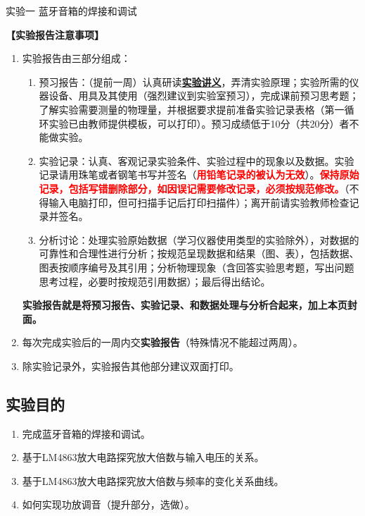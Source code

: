 \documentclass[dvipsnames, svgnames,a4paper,11pt]{article}
\begin{document}
\scoresTable{}{}{}{}{}{}{}{}


\begin{center}
	\LARGE 实验一 \quad 蓝牙音箱的焊接和调试
\end{center}

\textbf{【实验报告注意事项】}
\begin{enumerate}
	\item 实验报告由三部分组成：
	\begin{enumerate}
		\item 预习报告：（提前一周）认真研读\underline{\textbf{实验讲义}}，弄清实验原理；实验所需的仪器设备、用具及其使用（强烈建议到实验室预习），完成课前预习思考题；了解实验需要测量的物理量，并根据要求提前准备实验记录表格（第一循环实验已由教师提供模板，可以打印）。预习成绩低于10分（共20分）者不能做实验。
	    \item 实验记录：认真、客观记录实验条件、实验过程中的现象以及数据。实验记录请用珠笔或者钢笔书写并签名（\textcolor{red}{\textbf{用铅笔记录的被认为无效}}）。\textcolor{red}{\textbf{保持原始记录，包括写错删除部分，如因误记需要修改记录，必须按规范修改。}}（不得输入电脑打印，但可扫描手记后打印扫描件）；离开前请实验教师检查记录并签名。
	    \item 分析讨论：处理实验原始数据（学习仪器使用类型的实验除外），对数据的可靠性和合理性进行分析；按规范呈现数据和结果（图、表），包括数据、图表按顺序编号及其引用；分析物理现象（含回答实验思考题，写出问题思考过程，必要时按规范引用数据）；最后得出结论。
	\end{enumerate}
	\textbf{实验报告就是将预习报告、实验记录、和数据处理与分析合起来，加上本页封面。}
	\item 每次完成实验后的一周内交\textbf{实验报告}（特殊情况不能超过两周）。
	\item 除实验记录外，实验报告其他部分建议双面打印。
\end{enumerate}


\clearpage
\tableofcontents
\clearpage

\setcounter{section}{0}
	
\subsection{实验目的}
\begin{enumerate}
	\item 完成蓝牙音箱的焊接和调试。
	\item 基于LM4863放大电路探究放大倍数与输入电压的关系。
	\item 基于LM4863放大电路探究放大倍数与频率的变化关系曲线。
	\item 如何实现功放调音（提升部分，选做）。
\end{enumerate}
\end{document}
